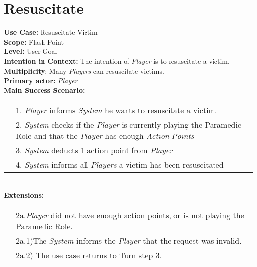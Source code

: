 \documentclass{article}
\begin{document}
	\section*{Resuscitate}
	\textbf{Use Case:} Resuscitate Victim\\
	\textbf{Scope:} Flash Point\\
	\textbf{Level:} User Goal\\
	\textbf{Intention in Context:} The intention of \textit{Player} is to resuscitate a victim.\\
	\textbf{Multiplicity}: Many \textit{Players} can resuscitate victims.\\
	\textbf{Primary actor:} \textit{Player}\\
	\textbf{Main Success Scenario:}\\
	\begin{tabular}{l l}
		&1. \textit{Player} informs \textit{System} he wants to resuscitate a victim.\\
		&2. \textit{System} checks if the \textit{Player} is currently playing the Paramedic Role and that the \textit{Player} has enough \textit{Action Points}\\	
		&3. \textit{System} deducts 1 action point from \textit{Player}\\
		&4. \textit{System} informs all \textit{Players} a victim has been resuscitated\\
	
	\end{tabular}\\
	\textbf{Extensions:}\\
	\begin{tabular}{l l}
		&2a.\textit{Player} did not have enough action points, or is not playing the Paramedic Role.\\
		&\qquad2a.1)The \textit{System} informs the \textit{Player} that the request was invalid.\\
		&\qquad2a.2) The use case returns to \underline{Turn} step 3.
	\end{tabular}
\end{document}
